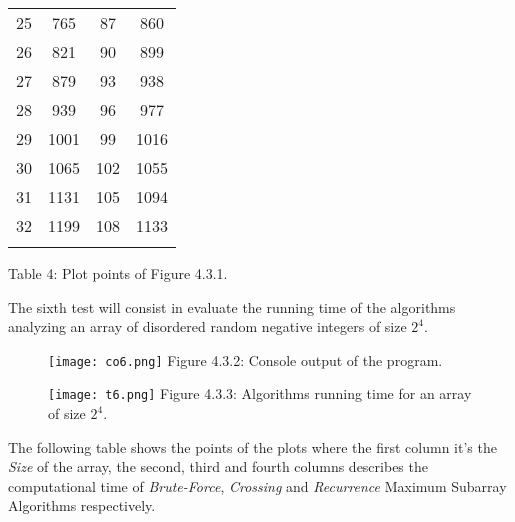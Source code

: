 \begin{center}
\begin{tabular}[.5cm]{ c c c c }
\cmidrule {1-4} 
25 & 765 & 87 & 860 \\ 
\cmidrule {1-4} 
26 & 821 & 90 & 899 \\ 
\cmidrule {1-4} 
27 & 879 & 93 & 938 \\ 
\cmidrule {1-4} 
28 & 939 & 96 & 977 \\ 
\cmidrule {1-4} 
29 & 1001 & 99 & 1016 \\ 
\cmidrule {1-4} 
30 & 1065 & 102 & 1055 \\ 
\cmidrule {1-4} 
31 & 1131 & 105 & 1094 \\ 
\cmidrule {1-4} 
32 & 1199 & 108 & 1133 \\ 
\bottomrule 
\linebreak 
\end{tabular} 
\linebreak \linebreak Table 4: Plot points of Figure 4.3.1.
\end{center} \hfill 

\pagebreak

The sixth test will consist in evaluate the running time of the algorithms analyzing an array of disordered random negative integers of size $2^{4}$. \hfill \break

\begin{figure}[H]
\texttt{[image: co6.png]}
\centering \linebreak \linebreak Figure 4.3.2: Console output of the program.
\end{figure} \hfill 

\begin{figure}[H]
\texttt{[image: t6.png]}
\centering \linebreak \linebreak Figure 4.3.3: Algorithms running time for an array of size $2^{4}$.
\end{figure} \hfill 

The following table shows the points of the plots where the first column it's the {\itshape Size} of the array, the second, third and fourth columns describes the computational time of {\itshape Brute-Force}, {\itshape Crossing} and {\itshape Recurrence} Maximum Subarray Algorithms respectively. \hfill \break

